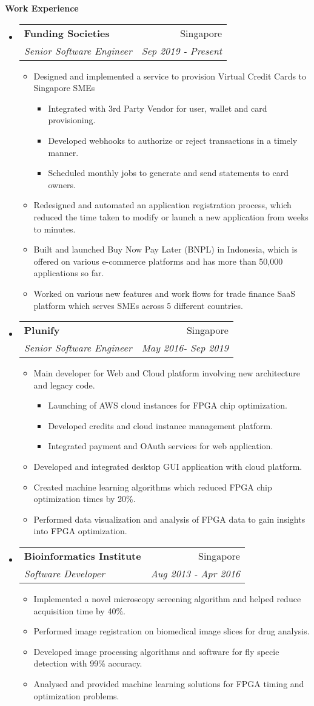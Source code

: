 \documentclass[letterpaper,11pt]{article}
\makeatletter
\newcommand{\resitem}[1]{\item #1 \vspace{-2pt}}
\newcommand{\resheading}[1]{{\large \colorbox{mygrey}{\begin{minipage}{\textwidth}{\textbf{#1 \vphantom{p\^{E}}}}\end{minipage}}}}
\newcommand{\ressubheading}[4]{
\begin{tabular*}{7.0in}{l@{\extracolsep{\fill}}r}
		\textbf{#1} & #2 \\
		\textit{#3} & \textit{#4} \\
\end{tabular*}\vspace{-6pt}}
\makeatother
\begin{document}
\resheading{Work Experience}
\begin{itemize}
\item
	\ressubheading{Funding Societies}{Singapore}{Senior Software Engineer}{Sep 2019 - Present}

	\begin{itemize}
		\resitem{Designed and implemented a service to provision Virtual Credit Cards to Singapore SMEs}
		 \begin{itemize}
			\resitem{Integrated with 3rd Party Vendor for user,  wallet and card provisioning.}
			\resitem{Developed webhooks to authorize or reject transactions in a timely manner.}
			\resitem{Scheduled monthly jobs to generate and send statements to card owners.}
		\end{itemize}
		\resitem{Redesigned and automated an application registration process,  which reduced the time taken to modify or launch a new application from weeks to minutes.}
		\resitem{Built and launched Buy Now Pay Later (BNPL) in Indonesia, which is offered on various e-commerce platforms and has more than 50,000 applications so far.}
		\resitem{Worked on various new features and work flows for trade finance SaaS platform which serves SMEs across 5 different countries.}
	\end{itemize}


\item
	\ressubheading{Plunify}{Singapore}{Senior Software Engineer}{May 2016- Sep 2019}
	\begin{itemize}
	    \resitem{Main developer for Web and Cloud platform involving new architecture and legacy code.}
	    \begin{itemize}
			\resitem{Launching of AWS cloud instances for FPGA chip optimization.}
			\resitem{Developed credits and cloud instance management platform.}
			\resitem{Integrated payment and OAuth services for web application.}
	    \end{itemize}
	    \resitem{Developed and integrated desktop GUI application with cloud platform.}
		\resitem{Created machine learning algorithms which reduced FPGA chip optimization times by 20\%.}
		\resitem{Performed data visualization and analysis of FPGA data to gain insights into FPGA optimization.}
	\end{itemize}


\item
	\ressubheading{Bioinformatics Institute}{Singapore}{Software Developer}{Aug 2013 - Apr 2016}
	\begin{itemize}
		\resitem{Implemented a novel microscopy screening algorithm and helped reduce acquisition time by 40\%.}
		\resitem{Performed image registration on biomedical image slices for drug analysis.}
		\resitem{Developed image processing algorithms and	 software for fly specie detection with 99\% accuracy.}
		\resitem{Analysed and provided machine learning solutions for FPGA timing and optimization problems.}
	\end{itemize}

\vspace{0.1in}
\end{itemize}
\end{document}
